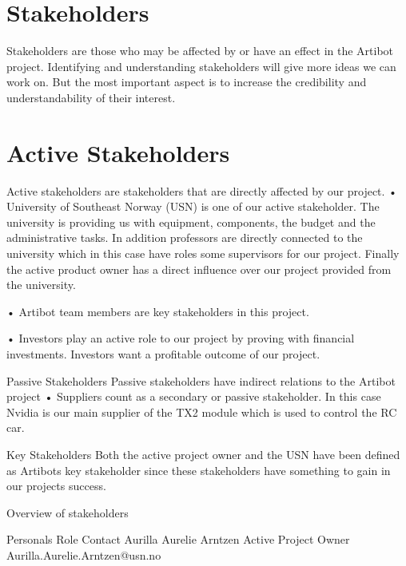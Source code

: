 \documentclass{article}
\begin{document}
\section{Stakeholders} 
Stakeholders are those who may be affected by or have an effect in the Artibot project. Identifying and understanding stakeholders will give more ideas we can work on. But the most important aspect is to increase the credibility and understandability of their interest. 

\section{Active Stakeholders} 

Active stakeholders are stakeholders that are directly affected by our project. 
•	University of Southeast Norway (USN) is one of our active stakeholder.
The university is providing us with equipment, components, the budget and the administrative tasks. In addition professors are directly connected to the university which in this case have roles some supervisors for our project. Finally the active product owner has a direct influence over our project provided from the university. 

•	Artibot team members are key stakeholders in this project. 

•	Investors play an active role to our project by proving with financial investments. Investors want a profitable outcome of our project. 

Passive Stakeholders
Passive stakeholders have indirect relations to the Artibot project
•	Suppliers count as a secondary or passive stakeholder. In this case Nvidia is our main supplier of the TX2 module which is used to control the RC car. 

Key Stakeholders 
Both the active project owner and the USN have been defined as Artibots key stakeholder since these stakeholders have something to gain in our projects success. 

Overview of stakeholders
 
	
Personals	Role	Contact
Aurilla Aurelie Arntzen	Active Project Owner 	Aurilla.Aurelie.Arntzen@usn.no
\end{document}
